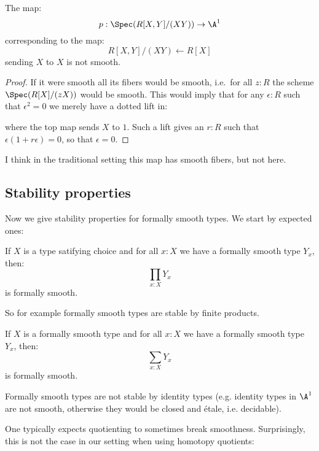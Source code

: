 \begin{lemma}
The map:
\[
p:\Spec(R[X,Y]/(XY))\to \A^1
\] 
corresponding to the map:
\[
R[X,Y]/(XY) \leftarrow R[X]
\]
sending $X$ to $X$ is not smooth.
\end{lemma}

\begin{proof}
If it were smooth all its fibers would be smooth,
i.e.\ for all $z:R$ the scheme $\Spec(R[X]/(zX))$ would be smooth.
This would imply that for any $\epsilon:R$ such that $\epsilon^2=0$ we merely have a dotted lift in:
 \begin{center}
    \end{center} 
    where the top map sends $X$ to $1$.
    Such a lift gives an $r:R$ such that $\epsilon(1+r\epsilon)=0$, so that $\epsilon=0$.
\end{proof}

I think in the traditional setting this map has smooth fibers, but not here. 

\subsection{Stability properties}

Now we give stability properties for formally smooth types. We start by expected ones:

\begin{lemma}
If $X$ is a type satifying choice and for all $x:X$ we have a formally smooth type $Y_x$, then:
\[\prod_{x:X}Y_x\]
is formally smooth.
\end{lemma}

So for example formally smooth types are stable by finite products. 

\begin{lemma}
\label{smooth-sigma-closed}
If $X$ is a formally smooth type and for all $x:X$ we have a formally smooth type $Y_x$, then:
\[\sum_{x:X}Y_x\]
is formally smooth.
\end{lemma}

Formally smooth types are not stable by identity types (e.g. identity types in $\A^1$ are not smooth, otherwise they would be closed and étale, i.e. decidable).

One typically expects quotienting to sometimes break smoothness. Surprisingly, this is not the case in our setting when using homotopy quotients:

